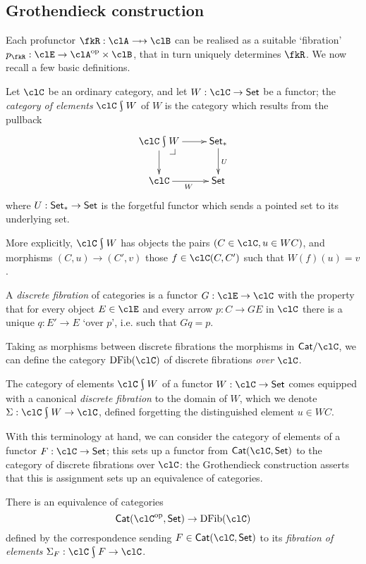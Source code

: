 \subsection{Gro\-then\-dieck construction}
Each profunctor $\fkR : \clA \pto \clB$ can be realised as a suitable `fibration' $p_\fkR : \clE \to \clA^\op\times\clB$, that in turn uniquely determines $\fkR$.
We now recall a few basic definitions.
\begin{definition}\label{eltsf}
  Let $\clC$ be an ordinary category, and let $W : \clC\to \Set$ be a functor; the \emph{category of elements} $\elts{\clC}{W}$ of $W$ is the category which results from the pullback
  \[
    \vcenter{\xymatrix{
      \elts{\clC}{W}\ar[r]\ar[d] \pb & \Set_* \ar[d]^U \\
      \clC \ar[r]_W & \Set
    }}
  \]
  where $U : \mathsf{Set}_*\to\mathsf{Set}$ is the forgetful functor which sends a pointed set to its underlying set.

  More explicitly, $\elts{\clC}{W}$ has objects the pairs $(C\in\clC, u\in WC)$, and morphisms $(C,u)\to (C',v)$ those $f\in \clC(C,C')$ such that $W(f)(u)=v$.
\end{definition}
\begin{definition}
  \label{def:dfib}
  A \emph{discrete fibration} of categories is a functor $G : \clE \to \clC$ with the property that for every object $E\in\clE$ and every arrow $p : C\to GE$ in $\clC$ there is a unique $q : E'\to E$ `over $p$', i.e. such that $Gq=p$.
\end{definition}
Taking as morphisms between discrete fibrations the morphisms in $\Qat/\clC$, we can define the category $\DFib(\clC)$ of discrete fibrations \emph{over} $\clC$.
\begin{proposition}\label{fibelem}
  The category of elements $\elts{\clC}{W}$ of a functor $W : \clC\to \Set$ comes equipped with a canonical \emph{discrete fibration} to the domain of $W$, which we denote $\Sigma : \elts{\clC}{W}\to \clC$, defined forgetting the distinguished element $u\in WC$.
\end{proposition}
With this terminology at hand, we can consider the category of elements of a functor $F : \clC\to \Set$; this sets up a functor from $\Qat(\clC,\Set)$ to the category of discrete fibrations over $\clC$: the Gro\-then\-dieck construction asserts that this is assignment sets up an equivalence of categories.%
\begin{theorem}\label{thm:equconfib}
  There is an equivalence of categories
  \[
    \Qat(\clC^\op,\Set) \to \DFib(\clC)
  \]
  defined by the correspondence sending $F\in\Qat(\clC,\Set)$ to its \emph{fibration of elements}  $\Sigma_F : \elts{\clC}{F} \to \clC$.
\end{theorem}
